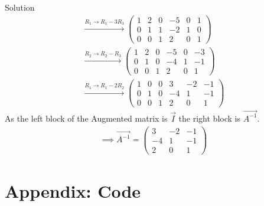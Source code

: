 \documentclass{beamer}
\numberwithin{equation}{section}
\theoremstyle{remark}
\begin{document}
\begin{frame}{Solution}
    \begin{align}
\xrightarrow{R_1 \rightarrow R_1-3R_3} \left(\begin{array}{ccc|ccc}
        1 & 2 & 0 & -5 & 0 & 1\\
        0 & 1 & 1 &  -2 & 1 & 0\\
        0 & 0 & 1 & 2 & 0 &1
\end{array}\right)\\
\xrightarrow{R_2 \rightarrow R_2-R_3} \left(\begin{array}{ccc|ccc}
        1 & 2 & 0 & -5 & 0 & -3\\
        0 & 1 & 0 &  -4 & 1 & -1\\
        0 & 0 & 1 & 2 & 0 &1
\end{array}\right)\\
\xrightarrow{R_1 \rightarrow R_1-2R_2} \left(\begin{array}{ccc|ccc}
        1 & 0 & 0 & 3 & -2 & -1\\
        0 & 1 & 0 &  -4 & 1 & -1\\
        0 & 0 & 1 & 2 & 0 &1
\end{array}\right)
\end{align}
As the left block of the Augmented matrix is $\Vec{I}$ the right block is $\Vec{A^{-1}}$.
\begin{align}
   \implies \Vec{A^{-1}}=\begin{pmatrix}
        3 & -2 & -1\\
        -4 & 1 & -1\\
        2 & 0 &1
    \end{pmatrix}
\end{align}
\end{frame}

\section*{Appendix: Code}
\end{document}
